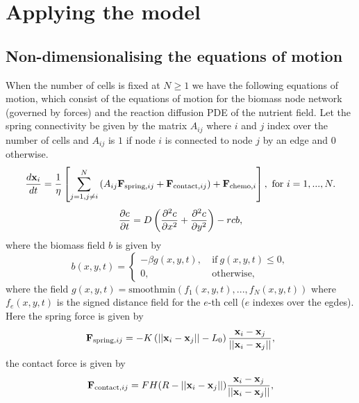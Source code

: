 
\chapter{Applying the model}




\section{Non-dimensionalising the equations of motion}
When the number of cells is fixed at $N \geq 1$ we have the following equations of motion,
which consist of the equations of motion for the biomass node network (governed by forces) and 
the reaction diffusion PDE of the nutrient field. Let the spring connectivity
be given by the matrix $A_{ij}$ where $i$ and $j$ index over the number of cells and $A_{ij}$
is $1$ if node $i$ is connected to node $j$ by an edge and $0$ otherwise.
\begin{equation*}
    \frac{d \vb{x}_i }{dt} = 
    \frac{1}{\eta} \left[\sum_{j = 1, j \neq i}^N   \left(A_{ij} \vb{F}_{\textrm{spring},ij} + 
     \vb{F}_{\textrm{contact},ij} \right) +\vb{F}_{\textrm{chemo},i}  \right] ,
    \ \textrm{for} \ i = 1, ... , N.
\end{equation*}
\begin{equation*}
    \pdv{c}{t} = D \left(\pdv[2]{c}{x} + \pdv[2]{c}{y} \right) - r c b,
\end{equation*}
where the biomass field $b$ is given by 
\begin{equation*}
b(x,y,t) = \begin{cases}
            -\beta g(x,y,t), & \ \textrm{if} \ g(x,y,t) \leq 0, \\
                0, &    \ \textrm{otherwise},
           \end{cases}
\end{equation*}
where the field $g(x,y,t) =\textrm{smoothmin}(f_1(x,y,t), ...,f_N(x,y,t) )$ where 
$f_e(x,y,t)$ is the signed distance field for the $e$-th cell ($e$ indexes over the egdes).
Here the spring force is given by 
\begin{equation}
    \vb{F}_{\textrm{spring},ij} = -K\left( ||\vb{x}_i - \vb{x}_j|| - L_0\right) \frac{\vb{x}_i - \vb{x}_j}{||\vb{x}_i - \vb{x}_j||},
\end{equation}
the contact force is given by 
\begin{equation}
    \vb{F}_{\textrm{contact},ij} = F H(R - ||\vb{x}_i - \vb{x}_j||) \frac{\vb{x}_i - \vb{x}_j}{||\vb{x}_i - \vb{x}_j||} ,
\end{equation}
